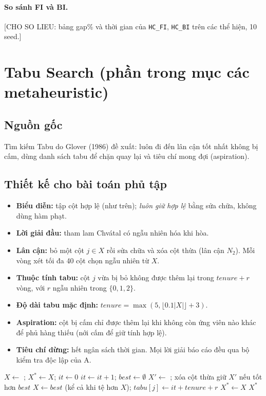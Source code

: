 \paragraph{So sánh FI và BI.} [CHO SO LIEU: bảng gap\% và thời gian của \texttt{HC\_FI}, \texttt{HC\_BI} trên các thể hiện, 10 seed.]

\section{Tabu Search (phần trong mục các metaheuristic)}

\subsection{Nguồn gốc}
Tìm kiếm Tabu do Glover (1986) đề xuất: luôn đi đến lân cận tốt nhất không bị cấm, dùng danh sách tabu để chặn quay lại và tiêu chí mong đợi (aspiration).

\subsection{Thiết kế cho bài toán phủ tập}
\begin{itemize}
  \item \textbf{Biểu diễn:} tập cột hợp lệ (như trên); \emph{luôn giữ hợp lệ} bằng sửa chữa, không dùng hàm phạt.
  \item \textbf{Lời giải đầu:} tham lam Chvátal có ngẫu nhiên hóa khi hòa.
  \item \textbf{Lân cận:} bỏ một cột $j\in X$ rồi sửa chữa và xóa cột thừa (lân cận $N_2$). Mỗi vòng xét tối đa 40 cột chọn ngẫu nhiên từ $X$.
  \item \textbf{Thuộc tính tabu:} cột $j$ vừa bị bỏ không được thêm lại trong $tenure+r$ vòng, với $r$ ngẫu nhiên trong $\{0,1,2\}$.
  \item \textbf{Độ dài tabu mặc định:} $tenure=\max(5,\lfloor 0.1|X|\rfloor+3)$.
  \item \textbf{Aspiration:} cột bị cấm chỉ được thêm lại khi không còn ứng viên nào khác để phủ hàng thiếu (nới cấm để giữ tính hợp lệ).
  \item \textbf{Tiêu chí dừng:} hết ngân sách thời gian. Mọi lời giải báo cáo đều qua bộ kiểm tra độc lập của A.
\end{itemize}

\begin{algorithm}[htbp]
\caption{Tabu Search cho Set Cover}
\begin{algorithmic}[1]
\State $X\gets$ ; $X^*\gets X$; $it\gets 0$
  \State $it\gets it+1$; $best\gets\emptyset$
    \State $X'\gets$ ; xóa cột thừa
    \State giữ $X'$ nếu tốt hơn $best$
  \EndFor
  \State $X\gets best$ (kể cả khi tệ hơn $X$); $tabu[j]\gets it+tenure+r$
   $X^*\gets X$ \EndIf
\EndWhile
\State \Return $X^*$
\end{algorithmic}
\end{algorithm}

